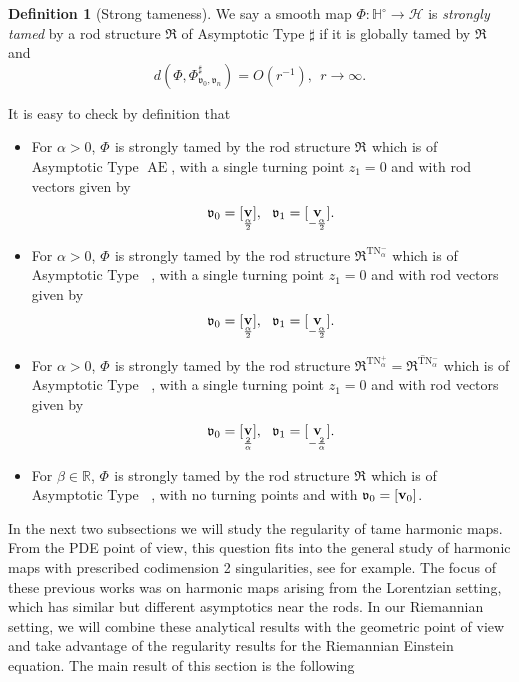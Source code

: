 \documentclass[a4paper,11pt]{amsart}
\theoremstyle{definition}
\newtheorem{definition}[theorem]{Definition}
\numberwithin{equation}{section}
\newcommand{\dH}{\mathbb{H}}
\newcommand{\R}{\mathbb{R}}
\newcommand{\mv} {\mathfrak v}
\newcommand{\mR} {\mathfrak R}
\DeclareMathOperator{\bv}{{\bf v}}
\DeclareMathOperator{\Aea}{AE_\alpha}
\DeclareMathOperator{\Ae}{AE}
\DeclareMathOperator{\TN}{TN}
\DeclareMathOperator{\TNap}{TN^+_\alpha}
\DeclareMathOperator{\TNam}{TN^{--}_\alpha}
\DeclareMathOperator{\ALFp}{ALF^+}
\DeclareMathOperator{\ALFm}{ALF^{--}}
\DeclareMathOperator{\AFa}{AF_\beta}
\begin{document}
  \begin{definition}[Strong tameness]\label{def:strong tameness}
   We say a smooth map $\Phi:\dH^\circ\rightarrow \mathcal H$ is \emph{strongly tamed} by a rod structure $\mR$ of  Asymptotic Type  $\sharp$ if it is globally tamed by $\mR$ and 
    $$d(\Phi,\Phi^{\sharp}_{\mv_0, \mv_n})=O(r^{-1}), \ \  r\rightarrow\infty.$$ 
 \end{definition}


It is easy to check by definition that 
\begin{itemize}
    \item For $\alpha>0$, $\Phi^{\Aea}$ is strongly tamed by the rod structure  $\mR^{\Aea}$ which is of  Asymptotic Type  $\Ae$, with a single turning point $z_1=0$ and with rod vectors given by 
$$\mathfrak v_0=[\bv_{\frac{\alpha}{2}}], \ \ \mathfrak v_1=[\bv_{-\frac{\alpha}{2}}].$$
\item  For $\alpha>0$, $\Phi^{\TNam}$ is strongly tamed by the rod structure $\mR^{\TN^-_\alpha}$ which is of  Asymptotic Type  $\ALFm$,  with a single turning point $z_1=0$ and with rod vectors given by 
$$\mathfrak v_0=[\bv_{\frac{\alpha}{2}}], \ \ \mathfrak v_1=[\bv_{-\frac{\alpha}{2}}].$$
\item For $\alpha>0$, $\Phi^{\TNap}$ is strongly tamed by the rod structure $\mR^{\TN^+_{\alpha}}=\overline{\mR^{\TN^-_{\alpha}}}$ which is of  Asymptotic Type  $\ALFp$, with a single turning point $z_1=0$ and with rod vectors given by
$$\mathfrak v_0=[\bv_{\frac{2}\alpha}], \ \ \mathfrak v_1=[\bv_{-\frac{2}{\alpha}}].$$
\item For $\beta\in\R$, $\Phi^{\AFa}$ is strongly tamed by the rod structure $\mR^{\AFa}$ which is of  Asymptotic Type  $\AFa$, with no turning points and with $\mv_0=[\bv_0]$.  
\end{itemize}

	
In the next two subsections we will study the regularity of tame harmonic maps. From the PDE point of view, this question fits into the general study of harmonic maps with prescribed codimension 2 singularities, see \cite{Weinstein, LiTian, HKWX} for example. The focus of these previous works was on harmonic maps arising from the Lorentzian setting, which has similar but different asymptotics near the rods. In our Riemannian setting, we will combine these analytical results with the geometric point of view and take advantage of the regularity results for the Riemannian Einstein equation. The main result of this section is the following
\end{document}
